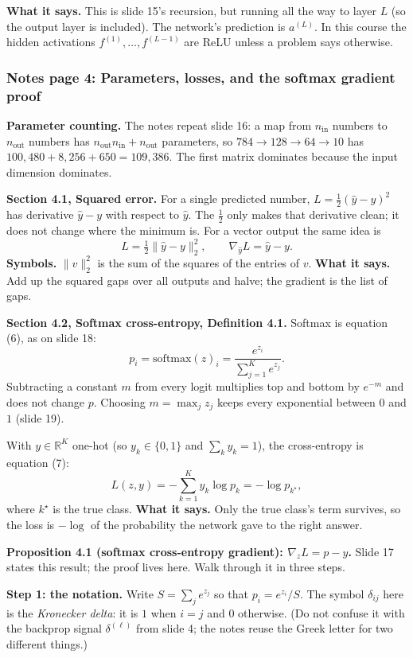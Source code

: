 \textbf{What it says.} This is slide 15's recursion, but running all the way to layer $L$ (so the output layer is included). The network's prediction is $a^{(L)}$. In this course the hidden activations $f^{(1)},\dots,f^{(L-1)}$ are ReLU unless a problem says otherwise.

\subsubsection{Notes page 4: Parameters, losses, and the softmax gradient proof}

\textbf{Parameter counting.} The notes repeat slide 16: a map from $n_{\text{in}}$ numbers to $n_{\text{out}}$ numbers has $n_{\text{out}}n_{\text{in}}+n_{\text{out}}$ parameters, so $784\to128\to64\to10$ has $100{,}480+8{,}256+650=109{,}386$. The first matrix dominates because the input dimension dominates.

\textbf{Section 4.1, Squared error.} For a single predicted number, $L=\tfrac12(\hat{y}-y)^2$ has derivative $\hat{y}-y$ with respect to $\hat{y}$. The $\tfrac12$ only makes that derivative clean; it does not change where the minimum is. For a vector output the same idea is
\[
L=\tfrac12\|\hat{y}-y\|_2^2, \qquad \nabla_{\hat{y}}L=\hat{y}-y .
\]
\textbf{Symbols.} $\|v\|_2^2$ is the sum of the squares of the entries of $v$. \textbf{What it says.} Add up the squared gaps over all outputs and halve; the gradient is the list of gaps.

\textbf{Section 4.2, Softmax cross-entropy, Definition 4.1.} Softmax is equation (6), as on slide 18:
\[
p_i=\text{softmax}(z)_i=\frac{e^{z_i}}{\sum_{j=1}^{K}e^{z_j}}.
\]
Subtracting a constant $m$ from every logit multiplies top and bottom by $e^{-m}$ and does not change $p$. Choosing $m=\max_jz_j$ keeps every exponential between $0$ and $1$ (slide 19).

With $y\in\mathbb{R}^K$ one-hot (so $y_k\in\{0,1\}$ and $\sum_ky_k=1$), the cross-entropy is equation (7):
\[
L(z,y)=-\sum_{k=1}^{K}y_k\log p_k=-\log p_{k^\star},
\]
where $k^\star$ is the true class. \textbf{What it says.} Only the true class's term survives, so the loss is $-\log$ of the probability the network gave to the right answer.

\textbf{Proposition 4.1 (softmax cross-entropy gradient): $\nabla_zL=p-y$.} Slide 17 states this result; the proof lives here. Walk through it in three steps.

\textbf{Step 1: the notation.} Write $S=\sum_je^{z_j}$ so that $p_i=e^{z_i}/S$. The symbol $\delta_{ij}$ here is the \emph{Kronecker delta}: it is $1$ when $i=j$ and $0$ otherwise. (Do not confuse it with the backprop signal $\delta^{(\ell)}$ from slide 4; the notes reuse the Greek letter for two different things.)

